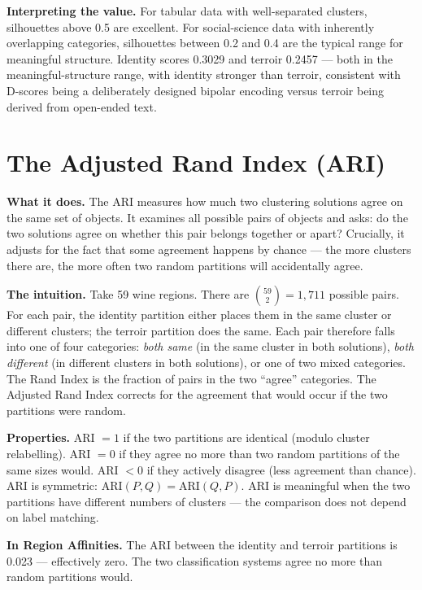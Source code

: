 \documentclass[11pt]{article}
\begin{document}
\textbf{Interpreting the value.} For tabular data with well-separated clusters, silhouettes above 0.5 are excellent. For social-science data with inherently overlapping categories, silhouettes between 0.2 and 0.4 are the typical range for meaningful structure. Identity scores 0.3029 and terroir 0.2457 --- both in the meaningful-structure range, with identity stronger than terroir, consistent with D-scores being a deliberately designed bipolar encoding versus terroir being derived from open-ended text.

\section{The Adjusted Rand Index (ARI)}

\textbf{What it does.} The ARI measures how much two clustering solutions agree on the same set of objects. It examines all possible pairs of objects and asks: do the two solutions agree on whether this pair belongs together or apart? Crucially, it adjusts for the fact that some agreement happens by chance --- the more clusters there are, the more often two random partitions will accidentally agree.

\textbf{The intuition.} Take 59 wine regions. There are $\binom{59}{2} = 1{,}711$ possible pairs. For each pair, the identity partition either places them in the same cluster or different clusters; the terroir partition does the same. Each pair therefore falls into one of four categories: \emph{both same} (in the same cluster in both solutions), \emph{both different} (in different clusters in both solutions), or one of two mixed categories. The Rand Index is the fraction of pairs in the two ``agree'' categories. The Adjusted Rand Index corrects for the agreement that would occur if the two partitions were random.

\textbf{Properties.} ARI $= 1$ if the two partitions are identical (modulo cluster relabelling). ARI $= 0$ if they agree no more than two random partitions of the same sizes would. ARI $< 0$ if they actively disagree (less agreement than chance). ARI is symmetric: $\mathrm{ARI}(P, Q) = \mathrm{ARI}(Q, P)$. ARI is meaningful when the two partitions have different numbers of clusters --- the comparison does not depend on label matching.

\textbf{In Region Affinities.} The ARI between the identity and terroir partitions is 0.023 --- effectively zero. The two classification systems agree no more than random partitions would.
\end{document}
